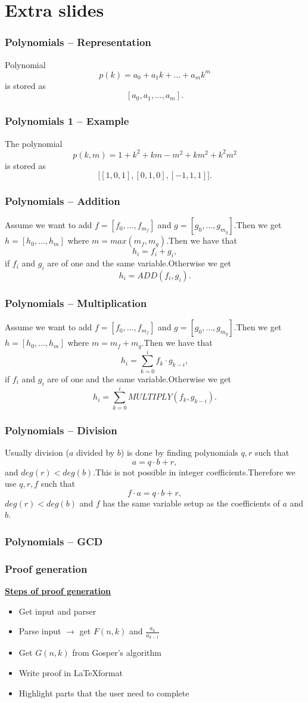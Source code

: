 \documentclass{beamer}
\newcommand{\ubf}[1]{\underline{\textbf{#1}}}
\begin{document}
\section*{Extra slides}%
\begin{frame}
  \frametitle{Polynomials -- Representation}
  Polynomial $$p(k)=a_0+a_1k+\ldots+a_mk^m$$ is stored as $$[a_0,a_1,\ldots,a_m].$$
\end{frame}
\begin{frame}
  \frametitle{Polynomials 1 -- Example}
  The polynomial $$p(k,m)=1+k^2+km-m^2+km^2+k^2m^2$$ is stored as $$\Big[[1,0,1],[0,1,0],[-1,1,1]\Big].$$
\end{frame}
\begin{frame}
  \frametitle{Polynomials -- Addition}
  Assume we want to add $f=[f_0,\ldots,f_{m_f}]$ and $g=[g_0,\ldots,g_{m_g}]$.\pause Then we get $h=[h_0,\ldots,h_m]$ where $m=max(m_f,m_g)$.\pause Then we have that
  $$h_i=f_i+g_i,$$
  if $f_i$ and $g_i$ are of one and the same variable.\pause Otherwise we get
  $$h_i=ADD(f_i,g_i).$$
\end{frame}
\begin{frame}
  \frametitle{Polynomials -- Multiplication}
  Assume we want to add $f=[f_0,\ldots,f_{m_f}]$ and $g=[g_0,\ldots,g_{m_g}]$.\pause Then we get $h=[h_0,\ldots,h_m]$ where $m=m_f+m_g$.\pause Then we have that
  $$h_i=\sum_{k=0}^i f_k\cdot g_{k-i},$$
  if $f_i$ and $g_i$ are of one and the same variable.\pause Otherwise we get
  $$h_i=\sum_{k=0}^i MULTIPLY(f_k,g_{k-i}).$$
\end{frame}
\begin{frame}
  \frametitle{Polynomials -- Division}
  Usually division ($a$ divided by $b$) is done by finding polynomials $q,r$ such that $$a=q\cdot b + r,$$
  and $deg(r)<deg(b)$.\pause This is not possible in integer coefficients.\pause Therefore we use $q,r,f$ such that $$f\cdot a=q\cdot b + r,$$ $deg(r)<deg(b)$ and $f$ has the same variable setup as the coefficients of $a$ and $b$.
\end{frame}
\begin{frame}
  \frametitle{Polynomials -- GCD}
\end{frame}
\begin{frame}
  \frametitle{Proof generation}
  \ubf{Steps of proof generation}
  \pause
  \begin{itemize}
    \item Get input and parser
    \pause
    \item Parse input $\rightarrow$ get $F(n,k)$ and $\frac{a_k}{a_{k-1}}$
    \pause
    \item Get $G(n,k)$ from Gosper's algorithm
    \pause
    \item Write proof in \LaTeX format
    \pause
    \item Highlight parts that the user need to complete
  \end{itemize}
\end{frame}
\end{document}
